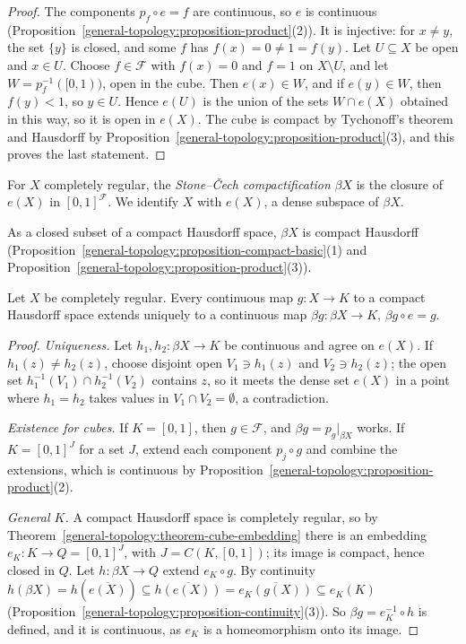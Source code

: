 \begin{proof}
The components $p_f \circ e = f$ are continuous, so $e$ is continuous (Proposition~\ref{general-topology:proposition-product}(2)). It is injective: for $x \neq y$, the set $\{y\}$ is closed, and some $f$ has
$f(x) = 0 \neq 1 = f(y)$. Let $U \subseteq X$ be open and $x \in U$. Choose $f \in \mathcal{F}$ with $f(x) = 0$ and $f = 1$ on $X \setminus U$, and let $W = p_f^{-1}([0, 1))$, open in the cube. Then $e(x) \in W$,
and if $e(y) \in W$, then $f(y) < 1$, so $y \in U$. Hence $e(U)$ is the union of the sets $W \cap e(X)$ obtained in this way, so it is open in $e(X)$. The cube is compact by Tychonoff's theorem and Hausdorff
by Proposition~\ref{general-topology:proposition-product}(3), and this proves the last statement.
\end{proof}

\begin{definition}\label{general-topology:definition-stone-cech}
For $X$ completely regular, the \emph{Stone--\v{C}ech compactification} $\beta X$ is the closure of $e(X)$ in $[0, 1]^{\mathcal{F}}$. We identify $X$ with $e(X)$, a dense subspace of $\beta X$.
\end{definition}

As a closed subset of a compact Hausdorff space, $\beta X$ is compact Hausdorff (Proposition~\ref{general-topology:proposition-compact-basic}(1) and Proposition~\ref{general-topology:proposition-product}(3)).

\begin{theorem}\label{general-topology:theorem-stone-cech}
Let $X$ be completely regular. Every continuous map $g \colon X \to K$ to a compact Hausdorff space extends uniquely to a continuous map $\beta g \colon \beta X \to K$, $\beta g \circ e = g$.
\end{theorem}

\begin{proof}
\emph{Uniqueness.} Let $h_1, h_2 \colon \beta X \to K$ be continuous and agree on $e(X)$. If $h_1(z) \neq h_2(z)$, choose disjoint open $V_1 \ni h_1(z)$ and $V_2 \ni h_2(z)$; the open set
$h_1^{-1}(V_1) \cap h_2^{-1}(V_2)$ contains $z$, so it meets the dense set $e(X)$ in a point where $h_1 = h_2$ takes values in $V_1 \cap V_2 = \emptyset$, a contradiction.

\emph{Existence for cubes.} If $K = [0, 1]$, then $g \in \mathcal{F}$, and $\beta g = p_g|_{\beta X}$ works. If $K = [0, 1]^J$ for a set $J$, extend each component $p_j \circ g$ and combine the extensions,
which is continuous by Proposition~\ref{general-topology:proposition-product}(2).

\emph{General $K$.} A compact Hausdorff space is completely regular, so by Theorem~\ref{general-topology:theorem-cube-embedding} there is an embedding $e_K \colon K \to Q = [0, 1]^{J}$, with
$J = C(K, [0, 1])$; its image is compact, hence closed in $Q$. Let $h \colon \beta X \to Q$ extend $e_K \circ g$. By continuity
$h(\beta X) = h(\overline{e(X)}) \subseteq \overline{h(e(X))} = \overline{e_K(g(X))} \subseteq e_K(K)$ (Proposition~\ref{general-topology:proposition-continuity}(3)). So $\beta g = e_K^{-1} \circ h$ is defined, and it is continuous,
as $e_K$ is a homeomorphism onto its image.
\end{proof}

